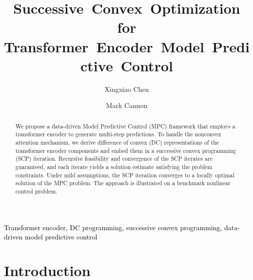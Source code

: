 \documentclass{ifacconf}
\begin{document}
\begin{frontmatter}

\title{Successive~Convex~Optimization for Transformer~Encoder~Model~Predictive~Control}

\author[Oxford]{Xingxiao Chen} 
\author[Oxford]{Mark Cannon} 

\address[Oxford]{Department of Engineering Science, University of Oxford, \{xingxiao.chen, mark.cannon\}@eng.ox.ac.uk}


\begin{abstract}
We propose a data-driven Model Predictive Control (MPC) framework that employs a transformer encoder to generate multi-step predictions. To handle the nonconvex attention mechanism, we derive difference of convex (DC) representations of the transformer encoder components and embed them in a successive convex programming (SCP) iteration. Recursive feasibility and convergence of the SCP iterates are guaranteed, and each iterate yields a solution estimate satisfying the problem constraints. Under mild assumptions, the SCP iteration converges to a locally optimal solution of the MPC problem. The approach is illustrated on a benchmark nonlinear control problem. 
\end{abstract}


\begin{keyword}
\textcolor{black}{Transformer encoder, DC programming, successive convex programming, data-driven model predictive control}
\end{keyword}
\end{frontmatter}


\section{Introduction}
\end{document}
